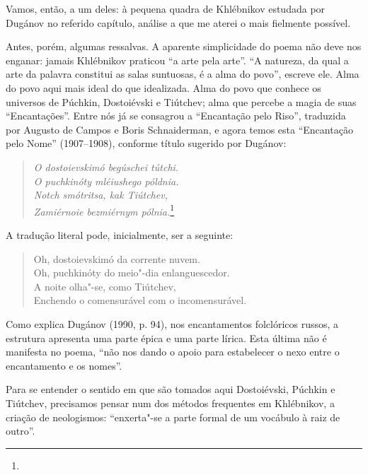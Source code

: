 Vamos, então, a um deles: à pequena quadra de Khlébnikov estudada por
Dugánov no referido capítulo, análise a que me aterei o mais fielmente
possível.

Antes, porém, algumas ressalvas. A aparente simplicidade do poema não
deve nos enganar: jamais Khlébnikov praticou ``a arte pela arte''. ``A
natureza, da qual a arte da palavra constitui as salas suntuosas, é a
alma do povo'', escreve ele. Alma do povo aqui mais ideal do que
idealizada. Alma do povo que conhece os universos de Púchkin,
Dostoiévski e Tiútchev; alma que percebe a magia de suas
``Encantações''. Entre nós já se consagrou a ``Encantação pelo Riso'',
traduzida por Augusto de Campos e Boris Schnaiderman, e agora temos esta
``Encantação pelo Nome'' (1907--1908), conforme título sugerido por
Dugánov:

\begin{verse}
\emph{O dostoievskimó begúschei tútchi.} \\
\emph{O puchkinóty mléiushego póldnia.} \\
\emph{Notch smótritsa, kak Tiútchev,} \\
\emph{Zamiérnoie bezmiérnym pólnia.}\footnote{{}} 

\end{verse}

A tradução literal pode, inicialmente, ser a seguinte:

\pagebreak

\begin{verse}
Oh, dostoievskimó da corrente nuvem. \\
Oh, puchkinóty do meio"-dia \qb{}enlanguescedor. \\
A noite olha"-se, como Tiútchev, \\
Enchendo o comensurável com o \qb{}incomensurável.
\end{verse}

Como explica Dugánov (1990, p. 94), nos encantamentos folclóricos
russos, a estrutura apresenta uma parte épica e uma parte lírica. Esta
última não é manifesta no poema, ``não nos dando o apoio para
estabelecer o nexo entre o encantamento e os nomes''.

Para se entender o sentido em que são tomados aqui Dostoiévski, Púchkin
e Tiútchev, precisamos pensar num dos métodos frequentes em Khlébnikov,
a criação de neologismos: ``enxerta"-se a parte formal de um vocábulo à
raiz de outro''.

